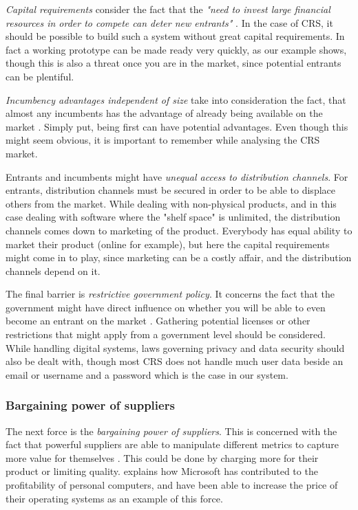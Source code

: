 \emph{Capital requirements} consider the fact that the \emph{"need to invest large financial resources in order to compete can deter new entrants"} \cite[p.~81]{porter2008five}. In the case of CRS, it should be possible to build such a system without great capital requirements. In fact a working prototype can be made ready very quickly, as our example shows, though this is also a threat once you are in the market, since potential entrants can be plentiful.

\emph{Incumbency advantages independent of size} take into consideration the fact, that almost any incumbents has the advantage of already being available on the market \cite[p.~81]{porter2008five}. Simply put, being first can have potential advantages. Even though this might seem obvious, it is important to remember while analysing the CRS market. 

Entrants and incumbents might have \emph{unequal access to distribution channels}. For entrants, distribution channels must be secured in order to be able to displace others from the market. While dealing with non-physical products, and in this case dealing with software where the "shelf space" is unlimited, the distribution channels comes down to marketing of the product. Everybody has equal ability to market their product (online for example), but here the capital requirements might come in to play, since marketing can be a costly affair, and the distribution channels depend on it.

The final barrier is \emph{restrictive government policy}. It concerns the fact that the government might have direct influence on whether you will be able to even become an entrant on the market \cite[p.~82]{porter2008five}. Gathering potential licenses or other restrictions that might apply from a government level should be considered. While handling digital systems, laws governing privacy and data security should also be dealt with, though most CRS does not handle much user data beside an email or username and a password which is the case in our system.

\subsubsection*{Bargaining power of suppliers}
The next force is the \emph{bargaining power of suppliers}. This is concerned with the fact that powerful suppliers are able to manipulate different metrics to capture more value for themselves \cite[p.~82]{porter2008five}. This could be done by charging more for their product or limiting quality.  explains how Microsoft has contributed to the profitability of personal computers, and have been able to increase the price of their operating systems as an example of this force.

